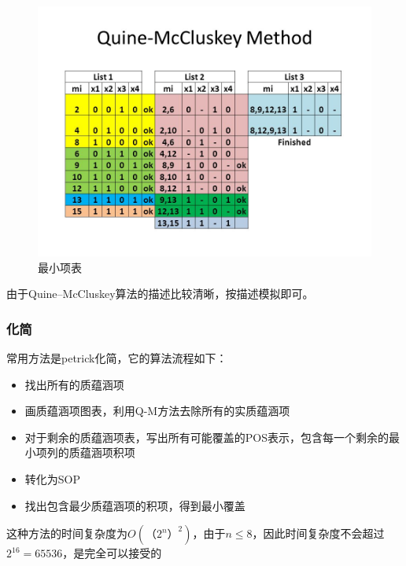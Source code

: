 	\begin{figure}[h]
		\centering
		\includegraphics[scale=0.5]{images/QM.jpg}
		\caption{最小项表}
	\end{figure}
	
	由于Quine–McCluskey算法的描述比较清晰，按描述模拟即可。
	
		

\subsubsection{化简}
	常用方法是petrick化简，它的算法流程如下：
	\begin{itemize}
		\item	找出所有的质蕴涵项
		\item	画质蕴涵项图表，利用Q-M方法去除所有的实质蕴涵项
		\item	对于剩余的质蕴涵项表，写出所有可能覆盖的POS表示，包含每一个剩余的最小项列的质蕴涵项积项
		\item	转化为SOP
		\item	找出包含最少质蕴涵项的积项，得到最小覆盖
	\end{itemize}
	
	这种方法的时间复杂度为$O(（2^n）^2)$，由于$n \le 8$，因此时间复杂度不会超过$2 ^ {16} = 65536$，是完全可以接受的
	
		
